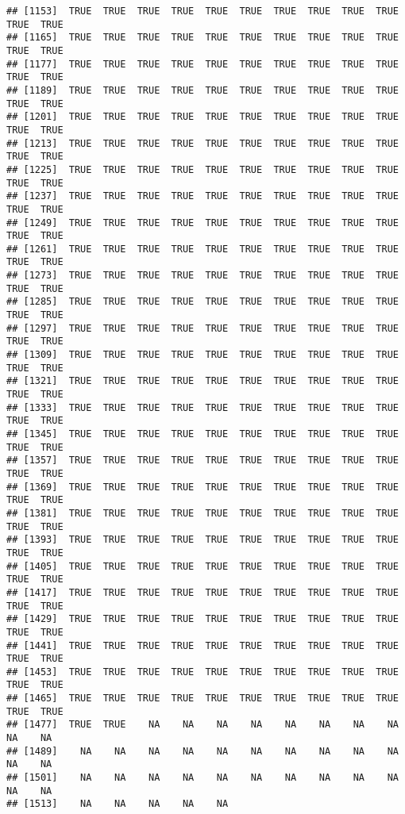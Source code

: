 \documentclass[
]{article}
\begin{document}
\begin{verbatim}
## [1153]  TRUE  TRUE  TRUE  TRUE  TRUE  TRUE  TRUE  TRUE  TRUE  TRUE  TRUE  TRUE
## [1165]  TRUE  TRUE  TRUE  TRUE  TRUE  TRUE  TRUE  TRUE  TRUE  TRUE  TRUE  TRUE
## [1177]  TRUE  TRUE  TRUE  TRUE  TRUE  TRUE  TRUE  TRUE  TRUE  TRUE  TRUE  TRUE
## [1189]  TRUE  TRUE  TRUE  TRUE  TRUE  TRUE  TRUE  TRUE  TRUE  TRUE  TRUE  TRUE
## [1201]  TRUE  TRUE  TRUE  TRUE  TRUE  TRUE  TRUE  TRUE  TRUE  TRUE  TRUE  TRUE
## [1213]  TRUE  TRUE  TRUE  TRUE  TRUE  TRUE  TRUE  TRUE  TRUE  TRUE  TRUE  TRUE
## [1225]  TRUE  TRUE  TRUE  TRUE  TRUE  TRUE  TRUE  TRUE  TRUE  TRUE  TRUE  TRUE
## [1237]  TRUE  TRUE  TRUE  TRUE  TRUE  TRUE  TRUE  TRUE  TRUE  TRUE  TRUE  TRUE
## [1249]  TRUE  TRUE  TRUE  TRUE  TRUE  TRUE  TRUE  TRUE  TRUE  TRUE  TRUE  TRUE
## [1261]  TRUE  TRUE  TRUE  TRUE  TRUE  TRUE  TRUE  TRUE  TRUE  TRUE  TRUE  TRUE
## [1273]  TRUE  TRUE  TRUE  TRUE  TRUE  TRUE  TRUE  TRUE  TRUE  TRUE  TRUE  TRUE
## [1285]  TRUE  TRUE  TRUE  TRUE  TRUE  TRUE  TRUE  TRUE  TRUE  TRUE  TRUE  TRUE
## [1297]  TRUE  TRUE  TRUE  TRUE  TRUE  TRUE  TRUE  TRUE  TRUE  TRUE  TRUE  TRUE
## [1309]  TRUE  TRUE  TRUE  TRUE  TRUE  TRUE  TRUE  TRUE  TRUE  TRUE  TRUE  TRUE
## [1321]  TRUE  TRUE  TRUE  TRUE  TRUE  TRUE  TRUE  TRUE  TRUE  TRUE  TRUE  TRUE
## [1333]  TRUE  TRUE  TRUE  TRUE  TRUE  TRUE  TRUE  TRUE  TRUE  TRUE  TRUE  TRUE
## [1345]  TRUE  TRUE  TRUE  TRUE  TRUE  TRUE  TRUE  TRUE  TRUE  TRUE  TRUE  TRUE
## [1357]  TRUE  TRUE  TRUE  TRUE  TRUE  TRUE  TRUE  TRUE  TRUE  TRUE  TRUE  TRUE
## [1369]  TRUE  TRUE  TRUE  TRUE  TRUE  TRUE  TRUE  TRUE  TRUE  TRUE  TRUE  TRUE
## [1381]  TRUE  TRUE  TRUE  TRUE  TRUE  TRUE  TRUE  TRUE  TRUE  TRUE  TRUE  TRUE
## [1393]  TRUE  TRUE  TRUE  TRUE  TRUE  TRUE  TRUE  TRUE  TRUE  TRUE  TRUE  TRUE
## [1405]  TRUE  TRUE  TRUE  TRUE  TRUE  TRUE  TRUE  TRUE  TRUE  TRUE  TRUE  TRUE
## [1417]  TRUE  TRUE  TRUE  TRUE  TRUE  TRUE  TRUE  TRUE  TRUE  TRUE  TRUE  TRUE
## [1429]  TRUE  TRUE  TRUE  TRUE  TRUE  TRUE  TRUE  TRUE  TRUE  TRUE  TRUE  TRUE
## [1441]  TRUE  TRUE  TRUE  TRUE  TRUE  TRUE  TRUE  TRUE  TRUE  TRUE  TRUE  TRUE
## [1453]  TRUE  TRUE  TRUE  TRUE  TRUE  TRUE  TRUE  TRUE  TRUE  TRUE  TRUE  TRUE
## [1465]  TRUE  TRUE  TRUE  TRUE  TRUE  TRUE  TRUE  TRUE  TRUE  TRUE  TRUE  TRUE
## [1477]  TRUE  TRUE    NA    NA    NA    NA    NA    NA    NA    NA    NA    NA
## [1489]    NA    NA    NA    NA    NA    NA    NA    NA    NA    NA    NA    NA
## [1501]    NA    NA    NA    NA    NA    NA    NA    NA    NA    NA    NA    NA
## [1513]    NA    NA    NA    NA    NA
\end{verbatim}
\end{document}
